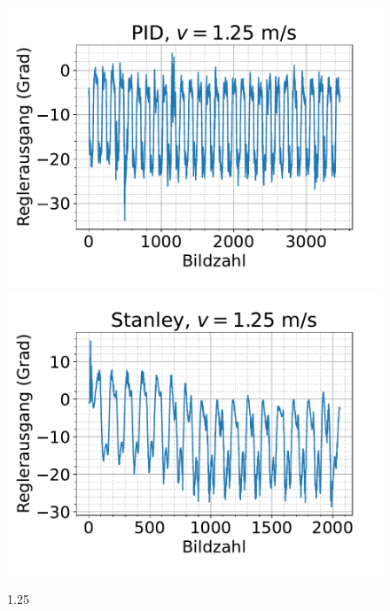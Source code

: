 \documentclass[arbeit=studie,oneside,BCOR=12mm]{ArbeitRST}
\begin{document}
\begin{figure}[h]
    \centering
    \includegraphics[scale=0.47]{pid1.25}
    \includegraphics[scale=0.47]{Stan1.25}
    \caption{1.25}
    \label{reg:1.25}
\end{figure}
\end{document}
